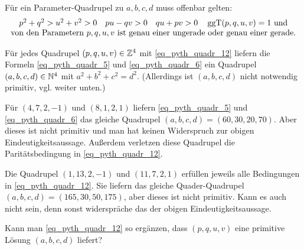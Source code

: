	Für ein Parameter-Quadrupel zu $a,b,c,d$ muss offenbar gelten:
	\begin{equation}
		\begin{array}{c}
			p^2+q^2 > u^2+v^2 > 0 \quad pu - qv > 0 \quad qu+pv > 0 \quad \operatorname{ggT}(p,q,u,v)=1 \text{ und} \\
			\text{von den Parametern } p,q,u,v \text{ ist genau einer ungerade oder genau einer gerade.} \label{eq_pyth_quadr_12}
		\end{array}
	\end{equation}
	
	Für jedes Quadrupel $(p,q,u,v) \in \mathbb{Z}^4$ mit \eqref{eq_pyth_quadr_12} liefern die Formeln \eqref{eq_pyth_quadr_5} und \eqref{eq_pyth_quadr_6} ein Quadrupel $(a,b,c,d) \in \mathbb{N}^4$ mit $a^2+b^2+c^2 = d^2$. (Allerdings ist $(a,b,c,d)$ nicht notwendig primitiv, vgl. weiter unten.)
	
	Für $(4,7,2,-1)$ und $(8,1,2,1)$ liefern \eqref{eq_pyth_quadr_5} und \eqref{eq_pyth_quadr_6} das gleiche Quadrupel $(a,b,c,d) = (60,30,20,70)$. Aber dieses ist nicht primitiv und man hat keinen Widerspruch zur obigen Eindeutigkeitsaussage. Außerdem verletzen diese Quadrupel die Paritätsbedingung in \eqref{eq_pyth_quadr_12}.
	
	Die Quadrupel $(1,13,2,-1)$ und $(11,7,2,1)$ erfüllen jeweils alle Bedingungen in \eqref{eq_pyth_quadr_12}. Sie liefern das gleiche Quader-Quadrupel $(a,b,c,d) = (165, 30, 50, 175)$, aber dieses ist nicht primitiv. Kann es auch nicht sein, denn sonst widerspräche das der obigen Eindeutigkeitsaussage.
	
	Kann man \eqref{eq_pyth_quadr_12} so ergänzen, dass $(p,q,u,v)$ eine primitive Lösung $(a,b,c,d)$ liefert?
\newpage